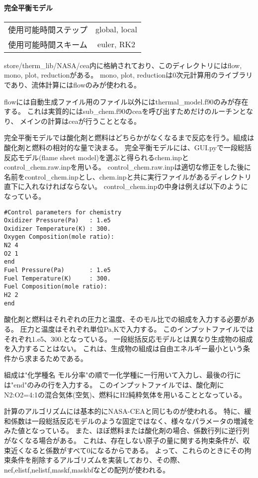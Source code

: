 \documentclass{jsarticle}
\begin{document}
\paragraph{完全平衡モデル}%
\begin{center}
\begin{tabular}{c||c}\hline
使用可能時間ステップ & global, local\\
使用可能時間スキーム & euler, RK2\\
\hline
\end{tabular}
\end{center}
store/therm\_lib/NASA/cea内に格納されており、このディレクトリにはflow, mono, plot, reductionがある。
mono, plot, reductionは0次元計算用のライブラリであり、流体計算にはflowのみが使われる。

flowには自動生成ファイル用のファイル以外にはthermal\_model.f90のみが存在する。
これは実質的にはsub\_chem.f90のceaを呼び出すためだけのルーチンとなり、
メインの計算はceaが行うこととなる。

完全平衡モデルでは酸化剤と燃料はどちらかがなくなるまで反応を行う。組成は酸化剤と燃料の相対的な量で決まる。
完全平衡モデルには、GUI.pyで一段総括反応モデル(flame sheet model)を選ぶと得られるchem.inpとcontrol\_chem.raw.inpを用いる。
control\_chem.raw.inpは適切な修正をした後に名前をcontrol\_chem.inpとし、chem.inpと共に実行ファイルがあるディレクトリ直下に入れなければならない。
control\_chem.inpの中身は例えば以下のようになっている。
\begin{verbatim}
#Control parameters for chemistry
Oxidizer Pressure(Pa)   : 1.e5
Oxidizer Temperature(K) : 300.
Oxygen Composition(mole ratio):
N2 4
O2 1
end
Fuel Pressure(Pa)       : 1.e5
Fuel Temperature(K)     : 300.
Fuel Composition(mole ratio):
H2 2
end
\end{verbatim}
酸化剤と燃料はそれぞれの圧力と温度、そのモル比での組成を入力する必要がある。
圧力と温度はそれぞれ単位Pa,Kで入力する。
このインプットファイルではそれぞれ1.e5、300.となっている。
一段総括反応モデルとは異なり生成物の組成を入力することはない。
これは、生成物の組成は自由エネルギー最小という条件から求まるためである。

組成は"化学種名 モル分率"の順で一化学種に一行用いて入力し、最後の行には"end"のみの行を入力する。
このインプットファイルでは、酸化剤にN2:O2=4:1の混合気体(空気)、燃料にH2純粋気体を用いることとなっている。

計算のアルゴリズムには基本的にNASA-CEAと同じものが使われる。
特に、緩和係数は一段総括反応モデルのような固定ではなく、様々なパラメータの増減をみた値となっている。
また、ほぼ燃料または酸化剤の場合、係数行列に逆行列がなくなる場合がある。
これは、存在しない原子の量に関する拘束条件が、収束近くなると係数がすべて0になるからである。
よって、これらのときにその拘束条件を削除するアルゴリズムを実装しており、その際、nef,elistf,nelistf,maskf,maskbfなどの配列が使われる。
\end{document}
